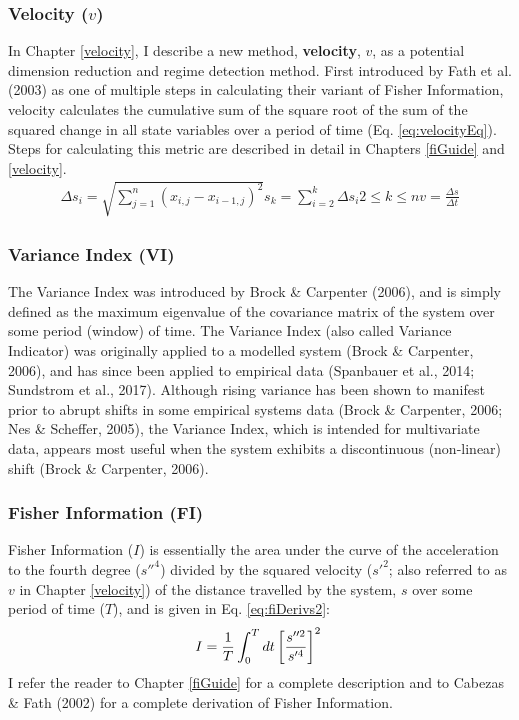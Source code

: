 \documentclass[12pt,twoside,openany]{reedthesis}
\begin{document}
\hypertarget{velocity-v}{%
\subsubsection{\texorpdfstring{Velocity (\(v\))}{Velocity (v)}}\label{velocity-v}}

In Chapter \ref{velocity}, I describe a new method, \textbf{velocity}, \(v\), as a potential dimension reduction and regime detection method. First introduced by Fath et al. (2003) as one of multiple steps in calculating their variant of Fisher Information, velocity calculates the cumulative sum of the square root of the sum of the squared change in all state variables over a period of time (Eq. \eqref{eq:velocityEq}). Steps for calculating this metric are described in detail in Chapters \ref{fiGuide} and \ref{velocity}.
\begin{equation}
\begin{array}{rcr}
\Delta s_i = \sqrt{\sum_{j=1}^{n} (x_{i,j} -x_{i-1, j})^2}
s_k =  \sum_{i=2}^{k}\Delta{s_i}
2\leq k \leq n
v =\frac{\Delta s}{\Delta t}  
\end{array}
\label{eq:velocityEq}
\end{equation}
\hypertarget{variance-index-vi}{%
\subsubsection{Variance Index (VI)}\label{variance-index-vi}}

The Variance Index was introduced by Brock \& Carpenter (2006), and is simply defined as the maximum eigenvalue of the covariance matrix of the system over some period (window) of time. The Variance Index (also called Variance Indicator) was originally applied to a modelled system (Brock \& Carpenter, 2006), and has since been applied to empirical data (Spanbauer et al., 2014; Sundstrom et al., 2017). Although rising variance has been shown to manifest prior to abrupt shifts in some empirical systems data (Brock \& Carpenter, 2006; Nes \& Scheffer, 2005), the Variance Index, which is intended for multivariate data, appears most useful when the system exhibits a discontinuous (non-linear) shift (Brock \& Carpenter, 2006).

\hypertarget{fisher-information-fi}{%
\subsubsection{Fisher Information (FI)}\label{fisher-information-fi}}

Fisher Information (\(I\)) is essentially the area under the curve of the acceleration to the fourth degree (\(s''^4\)) divided by the squared velocity (\(s'^2\); also referred to as \(v\) in Chapter \ref{velocity}) of the distance travelled by the system, \(s\) over some period of time (\(T\)), and is given in Eq. \eqref{eq:fiDerivs2}:
\begin{equation}   
    I = \frac{1}{T} \int_0^T dt\left[\frac{s''^2}{s'^4}\right]^2 \\  
  \label{eq:fiDerivs2}  
\end{equation}
I refer the reader to Chapter \ref{fiGuide} for a complete description and to Cabezas \& Fath (2002) for a complete derivation of Fisher Information.
\end{document}
